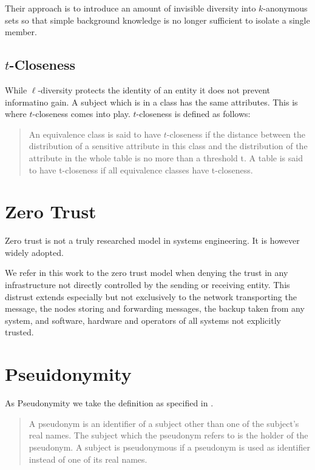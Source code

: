 Their approach is to introduce an amount of invisible diversity into $k$-anonymous sets so that simple background knowledge is no longer sufficient to isolate a single member.

\subsection{$t$-Closeness}
While $\ell$-diversity protects the identity of an entity it does not prevent informatino gain. A subject which is in a class has the same attributes. This is where $t$-closeness\cite{li2007t} comes into play. $t$-closeness is defined as follows:

\begin{quote}
  An equivalence class is said to have $t$-closeness if the distance between the distribution of a sensitive attribute in this class and the distribution of the attribute in the whole table is no more than a threshold t. A table is said to have t-closeness if all equivalence classes have t-closeness.
\end{quote}

\section{Zero Trust}
Zero trust is not a truly researched model in systems engineering. It is however widely adopted. 

We refer in this work to the zero trust model when denying the trust in any infrastructure not directly controlled by the sending or receiving entity. This distrust extends especially but not exclusively to the network transporting the message, the nodes storing and forwarding messages, the backup taken from any system, and software, hardware and operators of all systems not explicitly trusted.

\section{Pseuidonymity}
As Pseudonymity we take the definition as specified in \cite{anon_terminology}.

\begin{quote}
	A pseudonym is an identifier of a subject other than one of the subject's real
	names. The subject which the pseudonym refers to is the holder of the pseudonym. A subject is pseudonymous if a pseudonym is used as identifier instead of one of its real names.\omitted
\end{quote}

